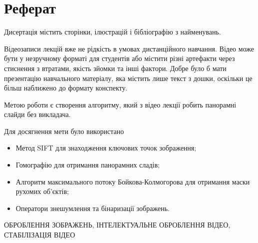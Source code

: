 \chapter*{Реферат}

Дисертація містить 
сторінки,
ілюстрацій
і бібліографію з 
найменувань.

Відеозаписи лекцій вже не рідкість 
в умовах дистанційного навчання.
Відео може бути у незручному форматі для 
студентів або містити різні артефакти 
через стиснення з втратами, якість зйомки та 
інші фактори. Добре було б мати презентацію навчального 
матеріалу, яка містить лише текст з дошки, 
оскільки це більш наближено до формату конспекту.

Метою роботи є 
створення алгоритму, який з відео лекції 
робить панорамні слайди без викладача.

Для досягнення мети було використано
\begin{itemize}
  \item
    Метод SIFT для знаходження ключових точок зображення;  
  \item
    Гомографію для отримання панорамних сладів;
  \item
    Алгоритм максимального потоку Бойкова-Колмогорова
    для отримання маски рухомих об'єктів;
  \item
    Оператори знешумлення та бінаризації зображень.
\end{itemize}

\MakeUppercase{оброблення зображень, інтелектуальне оброблення відео,
стабілізація відео}
